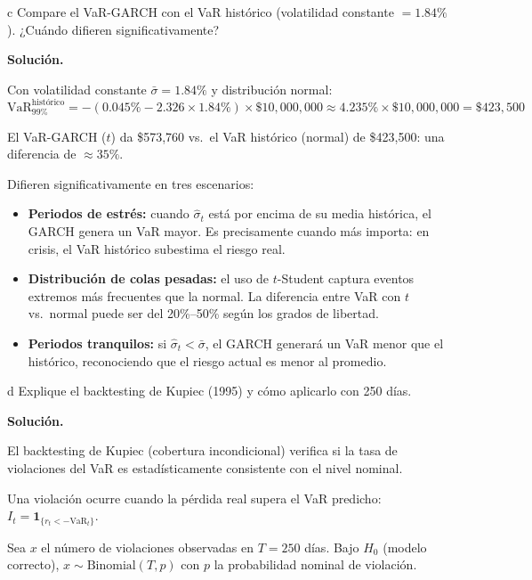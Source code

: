 \documentclass[11pt,a4paper]{article}
\begin{document}
\begin{cajaInciso}{c}
Compare el VaR-GARCH con el VaR histórico (volatilidad constante $=1.84\%$). ¿Cuándo difieren significativamente?
\end{cajaInciso}

\textbf{Solución.}

Con volatilidad constante $\bar{\sigma}=1.84\%$ y distribución normal:
\[
\text{VaR}_{99\%}^{\text{histórico}} = -(0.045\% - 2.326\times1.84\%)\times\$10{,}000{,}000
\approx 4.235\%\times\$10{,}000{,}000 = \$423{,}500
\]

El VaR-GARCH ($t$) da \$573,760 vs.\ el VaR histórico (normal) de \$423,500: una diferencia de $\approx 35\%$.

Difieren significativamente en tres escenarios:
\begin{itemize}[leftmargin=*]
  \item \textbf{Periodos de estrés:} cuando $\hat{\sigma}_t$ está por encima de su media histórica, el GARCH genera un VaR mayor. Es precisamente cuando más importa: en crisis, el VaR histórico subestima el riesgo real.
  \item \textbf{Distribución de colas pesadas:} el uso de $t$-Student captura eventos extremos más frecuentes que la normal. La diferencia entre VaR con $t$ vs.\ normal puede ser del 20\%--50\% según los grados de libertad.
  \item \textbf{Periodos tranquilos:} si $\hat{\sigma}_t<\bar{\sigma}$, el GARCH generará un VaR menor que el histórico, reconociendo que el riesgo actual es menor al promedio.
\end{itemize}

\begin{cajaInciso}{d}
Explique el backtesting de Kupiec (1995) y cómo aplicarlo con 250 días.
\end{cajaInciso}

\textbf{Solución.}

El backtesting de Kupiec (cobertura incondicional) verifica si la tasa de violaciones del VaR es estadísticamente consistente con el nivel nominal.

Una violación ocurre cuando la pérdida real supera el VaR predicho: $I_t = \mathbf{1}_{\{r_t < -\text{VaR}_t\}}$.

Sea $x$ el número de violaciones observadas en $T=250$ días. Bajo $H_0$ (modelo correcto), $x\sim\text{Binomial}(T,p)$ con $p$ la probabilidad nominal de violación.
\end{document}

